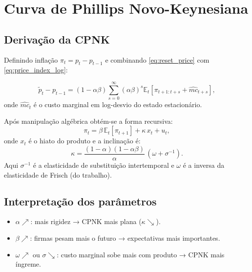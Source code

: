 \documentclass[11pt,a4paper]{article}
\newcommand{\E}{\mathbb{E}}
\begin{document}
\section{Curva de Phillips Novo-Keynesiana}

\subsection{Derivação da CPNK}

Definindo inflação $\pi_t = p_t - p_{t-1}$ e combinando
\eqref{eq:reset_price} com \eqref{eq:price_index_log}:

\begin{equation}
  \tilde{p}_t - p_{t-1} = (1-\alpha\beta)\sum_{s=0}^{\infty}(\alpha\beta)^s
                           \E_t[\pi_{t+1:t+s} + \hat{mc}_{t+s}],
\end{equation}
onde $\hat{mc}_t$ é o custo marginal em log-desvio do estado estacionário.

Após manipulação algébrica obtém-se a forma recursiva:
\begin{equation}\label{eq:nkpc}
  \boxed{\pi_t = \beta\,\E_t[\pi_{t+1}] + \kappa\,x_t + u_t},
\end{equation}
onde $x_t$ é o hiato do produto e a inclinação é:
\begin{equation}\label{eq:kappa}
  \kappa = \frac{(1-\alpha)(1-\alpha\beta)}{\alpha}\,(\omega + \sigma^{-1}).
\end{equation}
Aqui $\sigma^{-1}$ é a elasticidade de substituição intertemporal e $\omega$
é a inversa da elasticidade de Frisch (do trabalho).

\subsection{Interpretação dos parâmetros}

\begin{itemize}[leftmargin=*]
  \item $\alpha \nearrow$: mais rigidez → CPNK mais plana ($\kappa \searrow$).
  \item $\beta \nearrow$: firmas pesam mais o futuro → expectativas mais
        importantes.
  \item $\omega \nearrow$ ou $\sigma \searrow$: custo marginal sobe mais com
        produto → CPNK mais íngreme.
\end{itemize}
\end{document}
